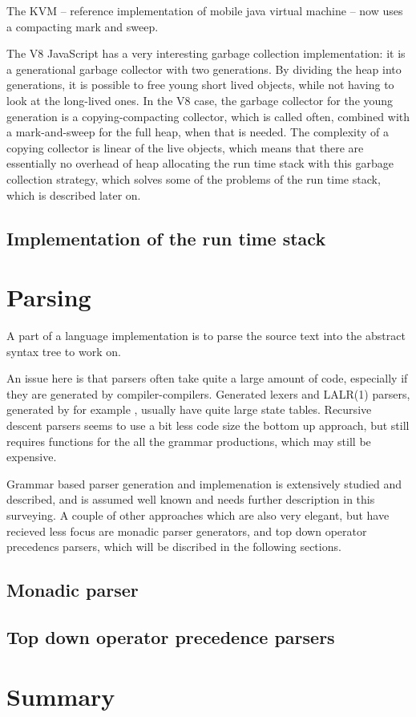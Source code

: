 The KVM -- reference implementation of mobile java virtual machine -- now uses a compacting mark and sweep.


The V8 JavaScript has a very interesting garbage collection implementation: it is a generational garbage collector with two generations.
By dividing the heap into generations, it is possible to free young short lived objects, while not having to look at the long-lived ones. 
In the V8 case, the garbage collector for the young generation is a copying-compacting collector, which is called often, combined with a mark-and-sweep for the full heap, when that is needed.
The complexity of a copying collector is linear of the live objects, which means that there are essentially no overhead of heap allocating the run time stack with this garbage collection strategy, which solves some of the problems of the run time stack, which is described later on.

\subsection{Implementation of the run time stack}

\section{Parsing}
A part of a language implementation is to parse the source text into the abstract syntax tree to work on. 

An issue here is that parsers often take quite a large amount of code, especially if they are generated by compiler-compilers.
Generated lexers and LALR(1) parsers, generated by for example \cite{yacc, yacc2}, usually have quite large state tables.
Recursive descent parsers seems to use a bit less code size the bottom up approach, but still requires functions for the all the grammar productions, which may still be expensive.

Grammar based parser generation and implemenation is extensively studied and described\cite{basics-of-compiler-design, grammar}, and is assumed well known and needs further description in this surveying.
A couple of other approaches which are also very elegant, 
but have recieved less focus are
monadic parser generators, and top down operator precedencs parsers,
which will be discribed in the following sections.

\subsection{Monadic parser}

\subsection{Top down operator precedence parsers}


\section{Summary}
